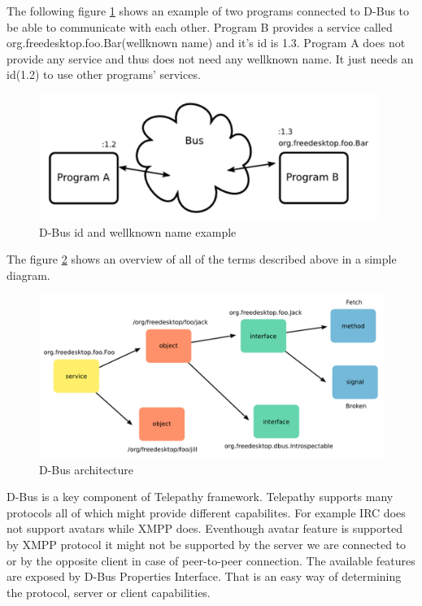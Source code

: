 The following figure \ref{fig:dbusArchitectureNames} shows an example of two programs connected to D-Bus to be able to communicate with each other. Program B provides a service called org.freedesktop.foo.Bar(wellknown name) and it's id is 1.3. Program A does not provide any service and thus does not need any wellknown name. It just needs an id(1.2) to use other programs' services.\cite{dbusTP}

\begin{figure}[ht]
\begin{center}
	\includegraphics[width=11cm]{fig/dbus-architecture-names.png}
	\caption{D-Bus id and wellknown name example\cite{dbusTP}}
	\label{fig:dbusArchitectureNames}
\end{center}
\end{figure}


The figure \ref{fig:dbusArchitecture} shows an overview of all of the terms described above in a simple diagram.

\begin{figure}[ht]
\begin{center}
	\includegraphics[width=15cm]{fig/dbus-architecture-overview.png}
	\caption{D-Bus architecture\cite{dbusTP}}
	\label{fig:dbusArchitecture}
\end{center}
\end{figure}

D-Bus is a key component of Telepathy framework. Telepathy supports many protocols all of which might provide different capabilites. For example IRC does not support avatars while XMPP does. Eventhough avatar feature is supported by XMPP protocol it might not be supported by the server we are connected to or by the opposite client in case of peer-to-peer connection. The available features are exposed by D-Bus Properties Interface. That is an easy way of determining the protocol, server or client capabilities.\cite{dbus}

